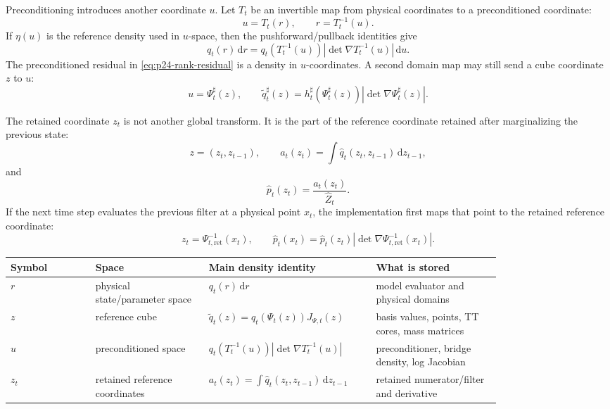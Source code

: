 \documentclass[11pt]{article}
\newcommand{\dd}{\,\mathrm d}
\begin{document}
Preconditioning introduces another coordinate \(u\).  Let \(T_t\) be an
invertible map from physical coordinates to a preconditioned coordinate:
\[
    u=T_t(r),
    \qquad
    r=T_t^{-1}(u).
    \label{eq:p24-coord-preconditioner}
\]
If \(\eta(u)\) is the reference density used in \(u\)-space, then the
pushforward/pullback identities give
\[
    q_t(r)\dd r
    =
    q_t(T_t^{-1}(u))
    \left|\det\nabla T_t^{-1}(u)\right|\dd u.
    \label{eq:p24-coord-density-u}
\]
The preconditioned residual in \eqref{eq:p24-rank-residual} is a density in
\(u\)-coordinates.  A second domain map may still send a cube coordinate \(z\)
to \(u\):
\[
    u=\Psi_t^\sharp(z),
    \qquad
    \widetilde q_t^\sharp(z)
    =
    h_t^\sharp(\Psi_t^\sharp(z))
    \left|\det\nabla\Psi_t^\sharp(z)\right|.
    \label{eq:p24-coord-preconditioned-reference}
\]

The retained coordinate \(z_t\) is not another global transform.  It is the
part of the reference coordinate retained after marginalizing the previous
state:
\[
    z=(z_t,z_{t-1}),
    \qquad
    a_t(z_t)=\int \widehat q_t(z_t,z_{t-1})\dd z_{t-1},
    \label{eq:p24-coord-retained}
\]
and
\[
    \widehat p_t(z_t)=\frac{a_t(z_t)}{\widehat Z_t}.
    \label{eq:p24-coord-retained-filter}
\]
If the next time step evaluates the previous filter at a physical point
\(x_t\), the implementation first maps that point to the retained reference
coordinate:
\[
    z_t=\Psi_{t,\mathrm{ret}}^{-1}(x_t),
    \qquad
    \widehat p_t(x_t)=
    \widehat p_t(z_t)
    \left|\det\nabla\Psi_{t,\mathrm{ret}}^{-1}(x_t)\right|.
    \label{eq:p24-coord-retained-physical}
\]

\begin{center}
\begin{tabular}{p{0.15\linewidth}p{0.20\linewidth}p{0.24\linewidth}p{0.22\linewidth}}
\toprule
Symbol & Space & Main density identity & What is stored\\
\midrule
\(r\) & physical state/parameter space &
\(q_t(r)\dd r\) &
model evaluator and physical domains\\
\(z\) & reference cube &
\(\widetilde q_t(z)=q_t(\Psi_t(z))J_{\Psi,t}(z)\) &
basis values, points, TT cores, mass matrices\\
\(u\) & preconditioned space &
\(q_t(T_t^{-1}(u))|\det\nabla T_t^{-1}(u)|\) &
preconditioner, bridge density, log Jacobian\\
\(z_t\) & retained reference coordinates &
\(a_t(z_t)=\int\widehat q_t(z_t,z_{t-1})\dd z_{t-1}\) &
retained numerator/filter and derivative\\
\bottomrule
\end{tabular}
\end{center}
\end{document}
